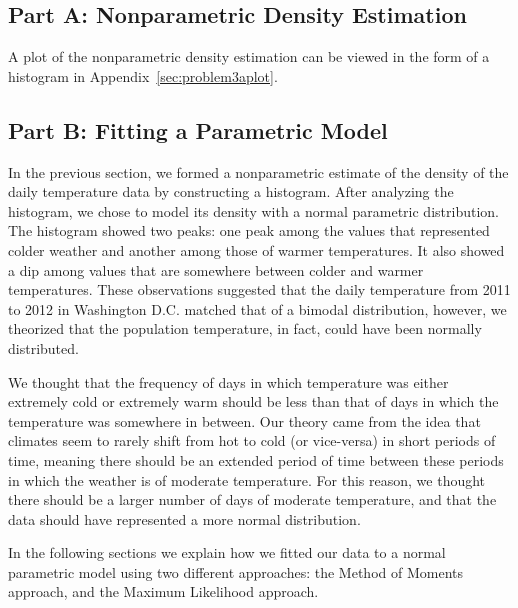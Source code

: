 \documentclass[11pt]{article}
\begin{document}
\subsection{Part A: Nonparametric Density Estimation}
\label{subsec:3a}
A plot of the nonparametric density estimation can be viewed in the form of a histogram in Appendix~\ref{sec:problem3aplot}.

\subsection{Part B: Fitting a Parametric Model}
\label{subsec:3b}
In the previous section, we formed a nonparametric estimate of the density of the daily temperature data by constructing a histogram. After analyzing the histogram, we chose to model its density with a normal parametric distribution. The histogram showed two peaks: one peak among the values that represented colder weather and another among those of warmer temperatures. It also showed a dip among values that are somewhere between colder and warmer temperatures. These observations suggested that the daily temperature from 2011 to 2012 in Washington D.C. matched that of a bimodal distribution, however, we theorized that the population temperature, in fact, could have been normally distributed.  

We thought that the frequency of days in which temperature was either extremely cold or extremely warm should be less than that of days in which the temperature was somewhere in between. Our theory came from the idea that climates seem to rarely shift from hot to cold (or vice-versa) in short periods of time, meaning there should be an extended period of time between these periods in which the weather is of moderate temperature. For this reason, we thought there should be a larger number of days of moderate temperature, and that the data should have represented a more normal distribution. 

In the following sections we explain how we fitted our data to a normal parametric model using two different approaches: the Method of Moments approach, and the Maximum Likelihood approach. 
\end{document}
